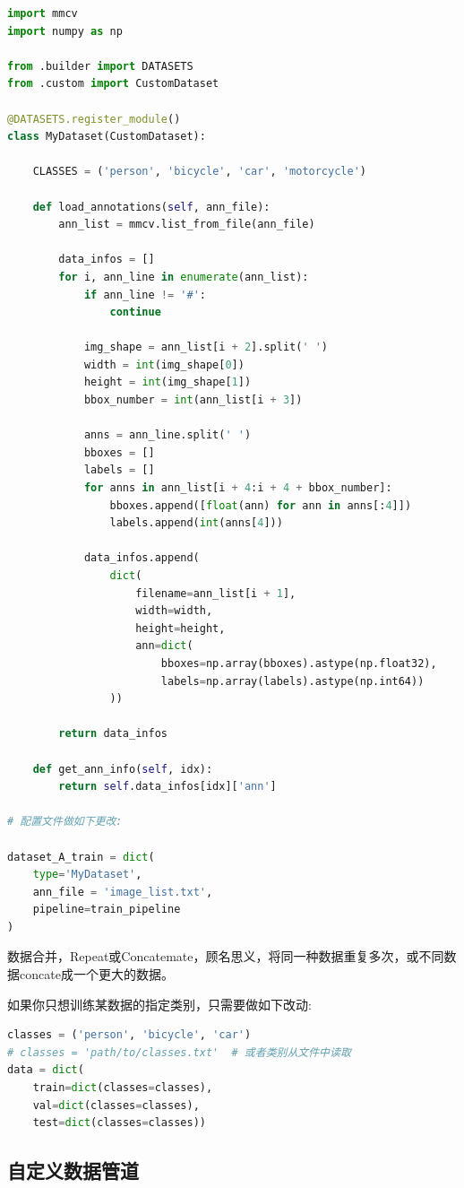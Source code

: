 \documentclass[UTF8]{ctexart}
\begin{document}
\lstset{style=mystyle}
\begin{lstlisting}[language=Python]
import mmcv
import numpy as np

from .builder import DATASETS
from .custom import CustomDataset

@DATASETS.register_module()
class MyDataset(CustomDataset):

	CLASSES = ('person', 'bicycle', 'car', 'motorcycle')

	def load_annotations(self, ann_file):
		ann_list = mmcv.list_from_file(ann_file)

		data_infos = []
		for i, ann_line in enumerate(ann_list):
			if ann_line != '#':
				continue

			img_shape = ann_list[i + 2].split(' ')
			width = int(img_shape[0])
			height = int(img_shape[1])
			bbox_number = int(ann_list[i + 3])

			anns = ann_line.split(' ')
			bboxes = []
			labels = []
			for anns in ann_list[i + 4:i + 4 + bbox_number]:
				bboxes.append([float(ann) for ann in anns[:4]])
				labels.append(int(anns[4]))

			data_infos.append(
				dict(
					filename=ann_list[i + 1],
					width=width,
					height=height,
					ann=dict(
						bboxes=np.array(bboxes).astype(np.float32),
						labels=np.array(labels).astype(np.int64))
				))

		return data_infos

	def get_ann_info(self, idx):
		return self.data_infos[idx]['ann']

# 配置文件做如下更改:

dataset_A_train = dict(
    type='MyDataset',
    ann_file = 'image_list.txt',
    pipeline=train_pipeline
)

\end{lstlisting}

数据合并，Repeat或Concatemate，顾名思义，将同一种数据重复多次，或不同数据concate成一个更大的数据。

如果你只想训练某数据的指定类别，只需要做如下改动:

\lstset{style=mystyle}
\begin{lstlisting}[language=Python]
classes = ('person', 'bicycle', 'car')
# classes = 'path/to/classes.txt'  # 或者类别从文件中读取
data = dict(
	train=dict(classes=classes),
	val=dict(classes=classes),
	test=dict(classes=classes))
\end{lstlisting}


\subsection{自定义数据管道}
\end{document}
